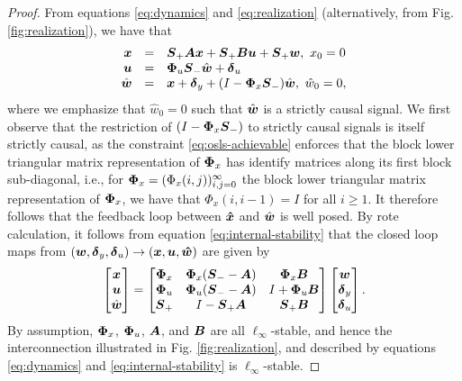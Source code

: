 \begin{proof}
From equations \eqref{eq:dynamics} and \eqref{eq:realization} (alternatively, from Fig. \ref{fig:realization}), we have that
\begin{equation}
\begin{array}{rcl}
\boldsymbol{x} &=& \boldsymbol{S}_+\boldsymbol{A}\boldsymbol{x} + \boldsymbol{S}_+\boldsymbol{B}\boldsymbol{u} + \boldsymbol{S}_+ \boldsymbol{w}, \ x_0 =0\\
\boldsymbol{u} &=& \boldsymbol{\Phi}_u\boldsymbol{S}_-\hat{\boldsymbol{w}} + \boldsymbol{\delta}_u\\
\hat{\boldsymbol{w}} &=& \boldsymbol{x} + \boldsymbol{\delta}_y + (I-\boldsymbol{\Phi}_x\boldsymbol{S}_-)\hat{\boldsymbol{w}}, \ \hat{w}_0=0,
\end{array}
\label{eq:internal-stability}
\end{equation}
where we emphasize that $\hat{w}_0 = 0$ such that $\hat{\boldsymbol{w}}$ is a strictly causal signal.  We first observe that the restriction of $(I-\boldsymbol{\Phi}_x\boldsymbol{S}_-)$ to strictly causal signals is itself strictly causal, as the constraint \eqref{eq:osls-achievable} enforces that the block lower triangular matrix representation of $\boldsymbol{\Phi}_x$ has identify matrices along its first block sub-diagonal, i.e., for $\boldsymbol{\Phi}_x = (\Phi_x(i,j))_{i,j=0}^\infty$ the block lower triangular matrix representation of $\boldsymbol{\Phi}_x$, we have that $\Phi_x(i,i-1)=I$ for all $i\geq 1$.  It therefore follows that the feedback loop between $\boldsymbol{\hat x}$ and $\hat{\boldsymbol{w}}$ is well posed.  By rote calculation, it follows from equation \eqref{eq:internal-stability} that the closed loop maps from $(\boldsymbol{w}, \boldsymbol{\delta}_y, \boldsymbol{\delta}_u) \to (\boldsymbol{x}, \boldsymbol{u}, \boldsymbol{\hat w})$ are given by
\begin{equation}
\begin{bmatrix}
\boldsymbol{x} \\ \boldsymbol{u} \\ \hat{\boldsymbol{w}}
\end{bmatrix} =
\begin{bmatrix} \boldsymbol{\Phi}_x & \boldsymbol{\Phi}_x(\boldsymbol{S}_- - \boldsymbol{A}) & \boldsymbol{\Phi}_x\boldsymbol{B} \\
\boldsymbol{\Phi}_u & \boldsymbol{\Phi}_u(\boldsymbol{S}_--\boldsymbol{A}) & I + \boldsymbol{\Phi}_u\boldsymbol{B} \\
\boldsymbol{S}_+ & I - \boldsymbol{S}_+\boldsymbol{A} & \boldsymbol{S}_+ \boldsymbol{B}
\end{bmatrix} \begin{bmatrix} \boldsymbol{w} \\ \boldsymbol{\delta}_y \\ \boldsymbol{\delta}_u \end{bmatrix}.
\end{equation}
By assumption, $\boldsymbol{\Phi}_x$, $\boldsymbol{\Phi}_u$, $\boldsymbol{A}$, and $\boldsymbol{B}$ are all $\ell_\infty$-stable, and hence the interconnection illustrated in Fig. \ref{fig:realization}, and described by equations \eqref{eq:dynamics} and \eqref{eq:internal-stability} is $\ell_\infty$-stable.
\end{proof}

